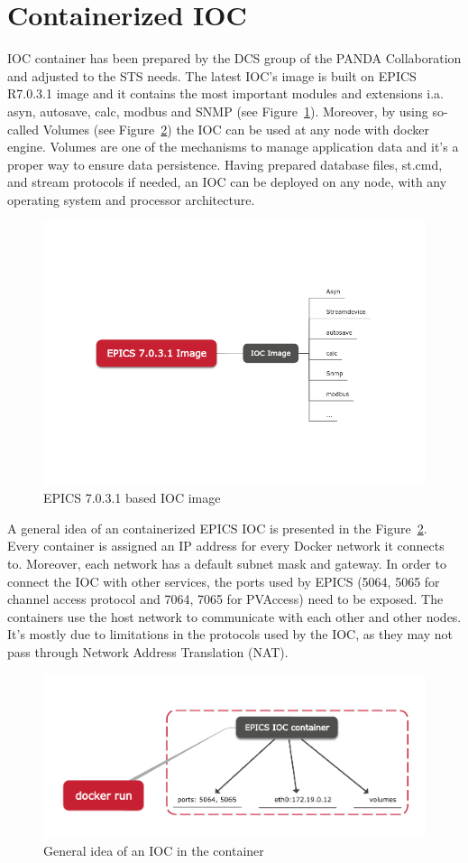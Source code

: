 \section{Containerized IOC}
IOC container has been prepared by the \gls{DCS} group of the \gls{PANDA} Collaboration and adjusted to the STS needs. The latest IOC's image is built on EPICS R7.0.3.1 image and it contains the most important modules and extensions i.a. asyn, autosave, calc, modbus and SNMP (see Figure~\ref{fig_ioc1}). Moreover, by using so-called Volumes (see Figure~\ref{fig_doc}) the \gls{IOC} can be used at any node with docker engine. Volumes are one of the mechanisms to manage application data and it's a proper way to ensure data persistence. Having prepared database files, st.cmd, and stream protocols if needed, an IOC can be deployed on any node, with any operating system and processor architecture.
\begin{figure}[!h]
\centering
\includegraphics[width=0.65\columnwidth]{Chapter3/DCS/images/epics_ioc.png}
\caption{EPICS 7.0.3.1 based IOC image}
\label{fig_ioc1}
\end{figure}
\newpage
A general idea of an containerized \gls{EPICS} \gls{IOC} is presented in the Figure~\ref{fig_doc}. Every container is assigned an IP address for every Docker network it connects to. Moreover, each network has a default subnet mask and gateway. In order to connect the IOC with other services, the ports used by \gls{EPICS} (5064, 5065 for channel access protocol and 7064, 7065 for PVAccess) need to be exposed.  The containers use the host network to communicate with each other and other nodes. It's mostly due to limitations in the protocols used by the \gls{IOC}, as they may not pass through Network Address Translation (NAT).
\begin{figure}[!h]
\centering
\includegraphics[width=0.7\columnwidth]{Chapter3/DCS/images/docker_run.png}
\caption{General idea of an IOC in the container}
\label{fig_doc}
\end{figure}
\newpage
